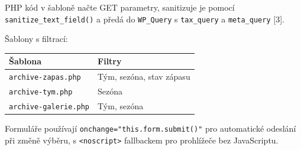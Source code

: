 \begin{Shaded}
\begin{Highlighting}[]
\DataTypeTok{\textless{}}\OperatorTok{=}\OperatorTok{=}\ErrorTok{\textless{}}\DataTypeTok{\textgreater{}}
    \DataTypeTok{\textless{}}\OperatorTok{=}\OperatorTok{=}\DataTypeTok{\textgreater{}}
        \DataTypeTok{\textless{}}\OperatorTok{=}\DataTypeTok{\textgreater{}}\DataTypeTok{\textless{}/}\DataTypeTok{\textgreater{}}
    \DataTypeTok{\textless{}/}\DataTypeTok{\textgreater{}}
    \DataTypeTok{\textless{}}\DataTypeTok{\textgreater{}\textless{}}\OperatorTok{=}\DataTypeTok{\textgreater{}}\DataTypeTok{\textless{}/}\DataTypeTok{\textgreater{}\textless{}/}\DataTypeTok{\textgreater{}}
\DataTypeTok{\textless{}/}\DataTypeTok{\textgreater{}}
\end{Highlighting}
\end{Shaded}

PHP kód v šabloně načte GET parametry, sanitizuje je pomocí
\texttt{sanitize\_text\_field()} a předá do \texttt{WP\_Query} s
\texttt{tax\_query} a \texttt{meta\_query} {[}3{]}.

Šablony s filtrací:

{\def\LTcaptype{none} %
\begin{longtable}[]{@{}ll@{}}
\toprule\noalign{}
Šablona & Filtry \\
\midrule\noalign{}
\endhead
\bottomrule\noalign{}
\endlastfoot
\texttt{archive-zapas.php} & Tým, sezóna, stav zápasu \\
\texttt{archive-tym.php} & Sezóna \\
\texttt{archive-galerie.php} & Tým, sezóna \\
\end{longtable}
}

Formuláře používají \texttt{onchange="this.form.submit()"} pro
automatické odeslání při změně výběru, s
\texttt{\textless{}noscript\textgreater{}} fallbackem pro prohlížeče bez
JavaScriptu.

